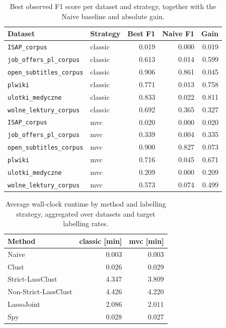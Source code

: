 \documentclass[11pt]{article}
\begin{document}
\begin{table}[H]
\caption{Best observed F1 score per dataset and strategy, together with the Naive baseline and absolute gain.}
\label{tab:benchmark_overview_best}
\centering
\small
\begin{tabular}{llrrr}
\toprule
Dataset & Strategy & Best F1 & Naive F1 & Gain \\
\midrule
\texttt{ISAP\_corpus} & classic & 0.019 & 0.000 & 0.019 \\
\texttt{job\_offers\_pl\_corpus} & classic & 0.613 & 0.014 & 0.599 \\
\texttt{open\_subtitles\_corpus} & classic & 0.906 & 0.861 & 0.045 \\
\texttt{plwiki} & classic & 0.771 & 0.013 & 0.758 \\
\texttt{ulotki\_medyczne} & classic & 0.833 & 0.022 & 0.811 \\
\texttt{wolne\_lektury\_corpus} & classic & 0.692 & 0.365 & 0.327 \\
\texttt{ISAP\_corpus} & mvc & 0.020 & 0.000 & 0.020 \\
\texttt{job\_offers\_pl\_corpus} & mvc & 0.339 & 0.004 & 0.335 \\
\texttt{open\_subtitles\_corpus} & mvc & 0.900 & 0.827 & 0.073 \\
\texttt{plwiki} & mvc & 0.716 & 0.045 & 0.671 \\
\texttt{ulotki\_medyczne} & mvc & 0.209 & 0.000 & 0.209 \\
\texttt{wolne\_lektury\_corpus} & mvc & 0.573 & 0.074 & 0.499 \\
\bottomrule
\end{tabular}
\end{table}

\begin{table}[H]
\caption{Average wall-clock runtime by method and labelling strategy, aggregated over datasets and target labelling rates.}
\label{tab:runtime_summary}
\centering
\small
\begin{tabular}{lrr}
\toprule
Method & classic [min] & mvc [min] \\
\midrule
Naive & 0.003 & 0.003 \\
Clust & 0.026 & 0.029 \\
Strict-LassClust & 4.347 & 3.809 \\
Non-Strict-LassClust & 4.426 & 4.220 \\
LassoJoint & 2.086 & 2.011 \\
Spy & 0.028 & 0.027 \\
\bottomrule
\end{tabular}
\end{table}
\end{document}
